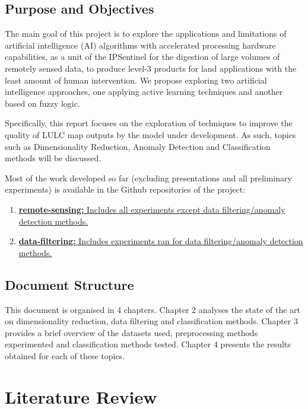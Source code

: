 \documentclass[12pt, english, openany]{book}
\begin{document}
\section{Purpose and Objectives}

The main goal of this project is to explore the applications and limitations of
artificial intelligence (AI) algorithms with accelerated processing hardware
capabilities, as a unit of the IPSentinel for the digestion of large volumes of
remotely sensed data, to produce level-3 products for land applications with
the least amount of human intervention. We propose exploring two artificial
intelligence approaches, one applying active learning techniques and another
based on fuzzy logic.

Specifically, this report focuses on the exploration of techniques to improve
the quality of LULC map outputs by the model under development. As such, topics
such as Dimensionality Reduction, Anomaly Detection and Classification methods
will be discussed.

Most of the work developed so far (excluding presentations and all preliminary
experiments) is available in the Github repositories of the project:
\begin{enumerate}
  \item \href{https://github.com/joaopfonseca/remote_sensing}{
          \textbf{remote-sensing:} Includes all experiments except data
          filtering/anomaly detection methods.}
  \item \href{https://github.com/joaopfonseca/data-filtering}{
          \textbf{data-filtering:} Includes experiments ran for data filtering/anomaly
          detection methods.}
\end{enumerate}

\section{Document Structure}

This document is organised in 4 chapters. Chapter 2 analyses the state of the
art on dimensionality reduction, data filtering and classification methods.
Chapter 3 provides a brief overview of the datasets used, preprocessing methods
experimented and classification methods tested. Chapter 4 presents the results
obtained for each of these topics.

\chapter{Literature Review}
\end{document}

